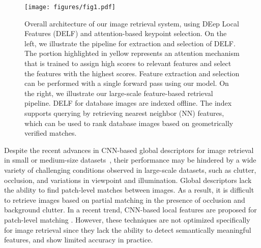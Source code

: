 \documentclass[10pt,twocolumn,letterpaper]{article}
\begin{document}
\begin{figure}[t]
\begin{center}
   \texttt{[image: figures/fig1.pdf]}
\end{center}
\vspace{-12pt}                                                                                                                                                                                                           
   \caption{Overall architecture of our image retrieval system, using DEep Local Features (DELF) and attention-based keypoint selection.  On the left, we illustrate the pipeline for extraction and selection of DELF.  The portion highlighted in yellow represents an attention mechanism that is trained to assign high scores to relevant features and select the features with the highest scores.  Feature extraction and selection can be performed with a single forward pass using our model.  On the right, we illustrate our large-scale feature-based retrieval pipeline.  DELF for database images are indexed offline. The index supports querying by retrieving nearest neighbor (NN) features, which can be used to rank database images based on geometrically verified matches.}
\label{fig:key_fig}
\vspace{-10pt}                                                                                                                                                                                                           
\end{figure}

\iffalse
{\color{red}Such deep global descriptors~\cite{radenovic2016cnn,gordo2016deep} achieve excellent performance in medium-size datasets~\cite{Philbin07,Philbin2008}, even improving upon systems which use local feature-based geometric verification.
In large datasets, on the other hand, a wide variety of imaging conditions is typically observed, which may hinder the performance of global descriptors: cluttered images, occluded objects, with large viewpoint and illumination variations. 
CNN-based local features have been proposed for patch-level matching~\cite{han2015matchnet,zagoruyko2015learning,yi2016lift}.
However, these features are not optimized for large-scale recognition and may suffer in this setting.}
\fi

Despite the recent advances in CNN-based global descriptors for image retrieval in small or medium-size datasets~\cite{Philbin07,Philbin2008}, their performance may be hindered by a wide variety of challenging conditions observed in large-scale datasets, such as clutter, occlusion, and variations in viewpoint and illumination.
Global descriptors lack the ability to find patch-level matches between images.
As a result, it is difficult to retrieve images based on partial matching in the presence of occlusion and background clutter.
In a recent trend, CNN-based local features are proposed for patch-level matching \cite{han2015matchnet,zagoruyko2015learning,yi2016lift}.
However, these techniques are not optimized specifically for image retrieval since they lack the ability to detect semantically meaningful features, and show limited accuracy in practice.
\end{document}
